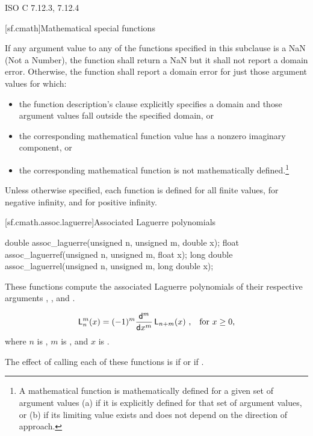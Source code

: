 \xref
ISO C 7.12.3, 7.12.4

[sf.cmath]{Mathematical special functions}%
%

\pnum{}%
If any argument value
to any of the functions specified in this subclause
is a NaN (Not a Number),
the function shall return a NaN
but it shall not report a domain error.
Otherwise,
the function shall report a domain error
for just those argument values
for which:

\begin{itemize}
  \item
  the function description's \returns clause
  explicitly specifies a domain
  and those argument values fall
  outside the specified domain,
  or

  \item
  the corresponding mathematical function value
  has a nonzero imaginary component,
  or

  \item
  the corresponding mathematical function
  is not mathematically defined.\footnote{%
    A mathematical function
    is mathematically defined
    for a given set of argument values
    (a)
      if it is explicitly defined
      for that set of argument values,
      or
    (b)
      if its limiting value exists
      and does not depend
      on the direction of approach.}
\end{itemize}

\pnum
Unless otherwise specified,
each function is defined
for all finite values,
for negative infinity,
and for positive infinity.

[sf.cmath.assoc.laguerre]{Associated Laguerre polynomials}%
%
%
%
%
%
\begin{itemdecl}
double       assoc_laguerre(unsigned n, unsigned m, double x);
float        assoc_laguerref(unsigned n, unsigned m, float x);
long double  assoc_laguerrel(unsigned n, unsigned m, long double x);
\end{itemdecl}

\begin{itemdescr}
\pnum
\effects
These functions compute
the associated Laguerre polynomials
of their respective arguments
, , and .

\pnum
\returns
\[ \mathsf{L}_n^m(x) =
   (-1)^m \frac{\mathsf{d} ^ m}{\mathsf{d}x ^ m} \, \mathsf{L}_{n+m}(x)
   \text{ ,\quad for $x \ge 0$,} \]
where
$n$ is ,
$m$ is , and
$x$ is .

\pnum
\remarks
The effect of calling each of these functions
is 
if  or if .
\end{itemdescr}

